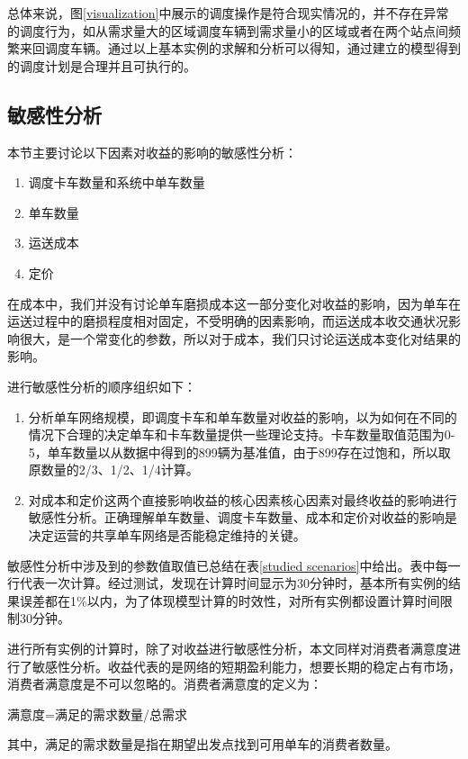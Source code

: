 \documentclass[]{tongjithesis}
\numberwithin{equation}{chapter}
\begin{document}
总体来说，图\ref{visualization}中展示的调度操作是符合现实情况的，并不存在异常的调度行为，如从需求量大的区域调度车辆到需求量小的区域或者在两个站点间频繁来回调度车辆。通过以上基本实例的求解和分析可以得知，通过建立的模型得到的调度计划是合理并且可执行的。
\subsection{敏感性分析}
本节主要讨论以下因素对收益的影响的敏感性分析：
\begin{enumerate}
	\item 调度卡车数量和系统中单车数量
	\item 单车数量
	\item 运送成本
	\item 定价
\end{enumerate}
在成本中，我们并没有讨论单车磨损成本这一部分变化对收益的影响，因为单车在运送过程中的磨损程度相对固定，不受明确的因素影响，而运送成本收交通状况影响很大，是一个常变化的参数，所以对于成本，我们只讨论运送成本变化对结果的影响。

进行敏感性分析的顺序组织如下：
\begin{enumerate}
	\item 分析单车网络规模，即调度卡车和单车数量对收益的影响，以为如何在不同的情况下合理的决定单车和卡车数量提供一些理论支持。卡车数量取值范围为0-5，单车数量以从数据中得到的899辆为基准值，由于899存在过饱和，所以取原数量的2/3、1/2、1/4计算。
	\item 对成本和定价这两个直接影响收益的核心因素核心因素对最终收益的影响进行敏感性分析。正确理解单车数量、调度卡车数量、成本和定价对收益的影响是决定运营的共享单车网络是否能稳定维持的关键。
\end{enumerate}
	
敏感性分析中涉及到的参数值取值已总结在表\ref{studied scenarios}中给出。表中每一行代表一次计算。经过测试，发现在计算时间显示为30分钟时，基本所有实例的结果误差都在1\%以内，为了体现模型计算的时效性，对所有实例都设置计算时间限制30分钟。

进行所有实例的计算时，除了对收益进行敏感性分析，本文同样对消费者满意度进行了敏感性分析。收益代表的是网络的短期盈利能力，想要长期的稳定占有市场，消费者满意度是不可以忽略的。消费者满意度的定义为：
\begin{center}
满意度=满足的需求数量/总需求
\end{center}
其中，满足的需求数量是指在期望出发点找到可用单车的消费者数量。
\end{document}
